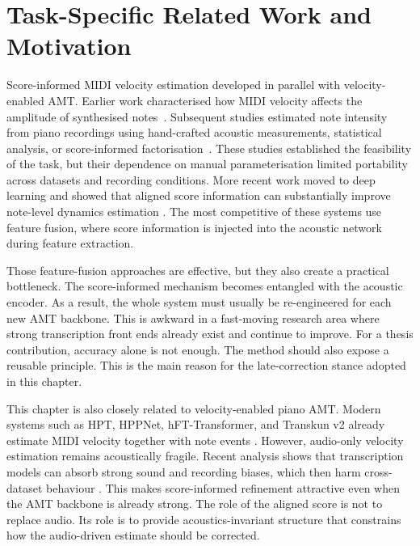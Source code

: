 \section{Task-Specific Related Work and Motivation}
\label{sec:scoreinf:related}

Score-informed MIDI velocity estimation developed in parallel with velocity-enabled AMT. Earlier work characterised how MIDI velocity affects the amplitude of synthesised notes~\cite{dan2006psy}. Subsequent studies estimated note intensity from piano recordings using hand-crafted acoustic measurements, statistical analysis, or score-informed factorisation~\cite{ewert2011est,jeong2017note,jeong2018timbre}. These studies established the feasibility of the task, but their dependence on manual parameterisation limited portability across datasets and recording conditions. More recent work moved to deep learning and showed that aligned score information can substantially improve note-level dynamics estimation \cite{kim2023score,kim2024method,kim2023diffvel}. The most competitive of these systems use feature fusion, where score information is injected into the acoustic network during feature extraction.

Those feature-fusion approaches are effective, but they also create a practical bottleneck. The score-informed mechanism becomes entangled with the acoustic encoder. As a result, the whole system must usually be re-engineered for each new AMT backbone. This is awkward in a fast-moving research area where strong transcription front ends already exist and continue to improve. For a thesis contribution, accuracy alone is not enough. The method should also expose a reusable principle. This is the main reason for the late-correction stance adopted in this chapter.

This chapter is also closely related to velocity-enabled piano AMT. Modern systems such as HPT, HPPNet, hFT-Transformer, and Transkun v2 already estimate MIDI velocity together with note events \cite{kong2021hpt,wei2022hppnet,toyama2023hft,yan2024semicrf}. However, audio-only velocity estimation remains acoustically fragile. Recent analysis shows that transcription models can absorb strong sound and recording biases, which then harm cross-dataset behaviour \cite{martak2026soundmusicbias}. This makes score-informed refinement attractive even when the AMT backbone is already strong. The role of the aligned score is not to replace audio. Its role is to provide acoustics-invariant structure that constrains how the audio-driven estimate should be corrected.

